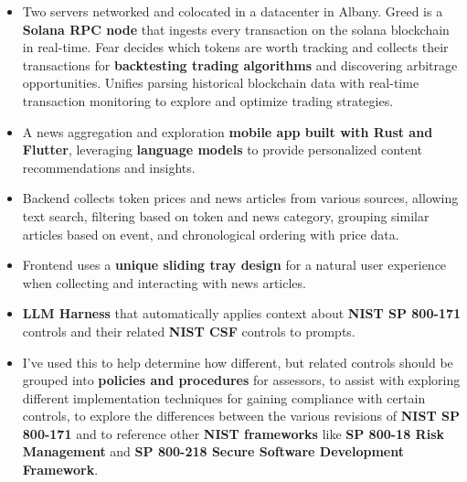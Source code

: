 

\begin{itemize}
\item Two servers networked and colocated in a datacenter in Albany. Greed is a \textbf{Solana RPC node} that ingests every transaction on the solana blockchain in real-time. Fear decides which tokens are worth tracking and collects their transactions for \textbf{backtesting trading algorithms} and discovering arbitrage opportunities. Unifies parsing historical blockchain data with real-time transaction monitoring to explore and optimize trading strategies. 
\smallskip
\end{itemize}
\smallskip
{}
\begin{itemize}
\item A news aggregation and exploration \textbf{mobile app built with Rust and Flutter}, leveraging \textbf{language models} to provide personalized content recommendations and insights.
\item Backend collects token prices and news articles from various sources, allowing text search, filtering based on token and news category, grouping similar articles based on event, and chronological ordering with price data. 
\item Frontend uses a \textbf{unique sliding tray design} for a natural user experience when collecting and interacting with news articles.
\smallskip
\end{itemize}
\smallskip
\smallskip
{}
\begin{itemize}
\item \textbf{LLM Harness} that automatically applies context about \textbf{NIST SP 800-171} controls and their related \textbf{NIST CSF} controls to prompts. 
\item I've used this to help determine how different, but related controls should be grouped into \textbf{policies and procedures} for assessors, to assist with exploring different implementation techniques for gaining compliance with certain controls, to explore the differences between the various revisions of \textbf{NIST SP 800-171} and to reference other \textbf{NIST frameworks} like \textbf{SP 800-18 Risk Management} and \textbf{SP 800-218 Secure Software Development Framework}.
\end{itemize}
\smallskip


